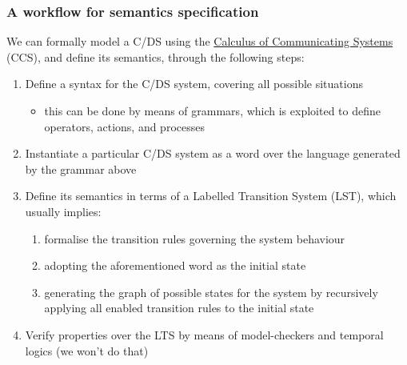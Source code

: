 \documentclass[presentation]{beamer}\mode<presentation>{\usetheme{AMSCesenaPurpleAndGold}}
\begin{document}
\begin{frame}[allowframebreaks]
\frametitle{A workflow for semantics specification}
    
    We can \alert{formally} model a C/DS using the \href{https://en.wikipedia.org/wiki/Calculus_of_communicating_systems}{\alert{Calculus of Communicating Systems}} (CCS), and define its semantics, through the following steps:
    \bigskip
    \begin{enumerate}
        \item Define a \alert{syntax} for the C/DS system, covering all possible situations
        \begin{itemize}
            \item this can be done by means of \alert{grammars}, which is exploited to define operators, actions, and processes
        \end{itemize}

        \bigskip
        
        \item Instantiate a particular C/DS system as a \alert{word} over the language generated by the grammar above
        
        \framebreak
        
        \item Define its semantics in terms of a \alert{Labelled Transition System} (LST), which usually implies:
        \begin{enumerate}
            \item formalise the \alert{transition rules} governing the system behaviour
        
            \item adopting the aforementioned word as the \alert{initial state}
            
            \item generating the graph of possible states for the system by recursively applying all enabled transition rules to the initial state
        \end{enumerate}
        
        \bigskip

        \item Verify properties over the LTS by means of \alert{model-checkers} and \alert{temporal logics} (we won't do that) 
    \end{enumerate}
    
\end{frame}
\end{document}

